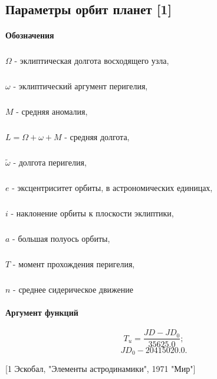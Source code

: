 \subsection{Параметры орбит планет [1]}
\paragraph{Обозначения}
\subparagraph{}$\Omega$ - эклиптическая долгота восходящего узла,
\subparagraph{}$\omega$ - эклиптический аргумент перигелия,
\subparagraph{}$M$ - средняя аномалия,
\subparagraph{}$L = \Omega + \omega + M$ - средняя долгота,
\subparagraph{}$\widetilde{\omega}$ - долгота перигелия,
\subparagraph{}$e$ - эксцентриситет орбиты, в астрономических единицах,
\subparagraph{}$i$ - наклонение орбиты к плоскости эклиптики,
\subparagraph{}$a$ - большая полуось орбиты,
\subparagraph{}$T$ - момент прохождения перигелия,
\subparagraph{}$n$ - среднее сидерическое движение

\paragraph{Аргумент функций}
$$T_u = \frac{{JD} - {JD}_0}{35625.0};$$
$${JD}_0 - 20415020.0.$$



[1 Эскобал, "Элементы астродинамики", 1971 "Мир"]

